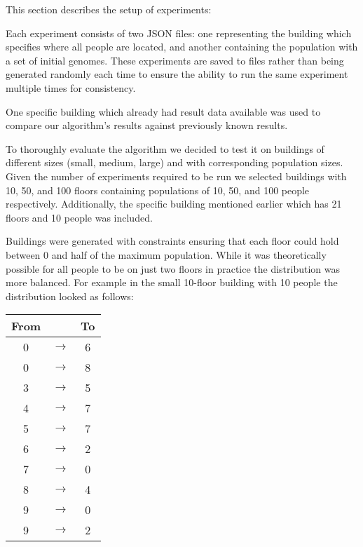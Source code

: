 This section describes the setup of experiments:

Each experiment consists of two JSON files: one representing the building which specifies where all people are located, and another containing the population with a set of initial genomes.
These experiments are saved to files rather than being generated randomly each time to ensure the ability to run the same experiment multiple times for consistency.

One specific building which already had result data available was used to compare our algorithm's results against previously known results.

To thoroughly evaluate the algorithm we decided to test it on buildings of different sizes (small, medium, large) and with corresponding population sizes.
Given the number of experiments required to be run we selected buildings with 10, 50, and 100 floors containing populations of 10, 50, and 100 people respectively. Additionally, the specific building mentioned earlier which has 21 floors and 10 people was included.

Buildings were generated with constraints ensuring that each floor could hold between 0 and half of the maximum population.
While it was theoretically possible for all people to be on just two floors in practice the distribution was more balanced. For example in the small 10-floor building with 10 people the distribution looked as follows:

\begin{center}
	\begin{tabular}{c c c}
		\textbf{From} &       & \textbf{To} \\
		\hline
		0             & $\to$ & 6           \\
		0             & $\to$ & 8           \\
		3             & $\to$ & 5           \\
		4             & $\to$ & 7           \\
		5             & $\to$ & 7           \\
		6             & $\to$ & 2           \\
		7             & $\to$ & 0           \\
		8             & $\to$ & 4           \\
		9             & $\to$ & 0           \\
		9             & $\to$ & 2           \\
	\end{tabular}
\end{center}

